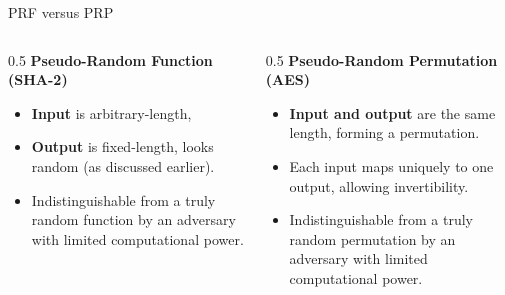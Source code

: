 \documentclass[aspectratio=169, lualatex, handout]{beamer}
\begin{document}
	\begin{frame}{PRF versus PRP}
		\begin{columns}[c]
			\begin{column}{0.5\textwidth}
				\textbf{Pseudo-Random Function (SHA-2)}
				\begin{itemize}
					\item \textbf{Input} is arbitrary-length,

					\item \textbf{Output} is fixed-length, looks random (as discussed
						earlier).

					\item Indistinguishable from a truly random function by an adversary with
						limited computational power.
				\end{itemize}
			\end{column}

			\begin{column}{0.5\textwidth}
				\textbf{Pseudo-Random Permutation (AES)}
				\begin{itemize}
					\item \textbf{Input and output} are the same length, forming a permutation.

					\item Each input maps uniquely to one output, allowing invertibility.

					\item Indistinguishable from a truly random permutation by an adversary
						with limited computational power.
				\end{itemize}
			\end{column}
		\end{columns}
	\end{frame}
\end{document}
